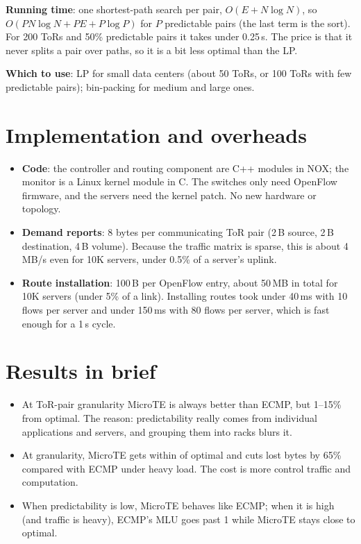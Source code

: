 \textbf{Running time}: one shortest-path search per pair, $O(E + N\log N)$, so $O(PN\log N + PE + P\log P)$ for $P$ predictable pairs
(the last term is the sort). For 200 ToRs and 50\% predictable pairs it takes under 0.25\,s. The price is that it never splits a pair over
paths, so it is a bit less optimal than the LP.

\textbf{Which to use}: LP for small data centers (about 50 ToRs, or 100 ToRs with few predictable pairs); bin-packing for medium and large ones.

\section{Implementation and overheads}
\begin{itemize}
  \item \textbf{Code}: the controller and routing component are C++ modules in NOX; the monitor is a Linux kernel module in C. The switches only need
        OpenFlow firmware, and the servers need the kernel patch. No new hardware or topology.
  \item \textbf{Demand reports}: 8 bytes per communicating ToR pair (2\,B source, 2\,B destination, 4\,B volume). Because the traffic matrix is sparse,
        this is about 4\,MB/s even for 10K servers, under 0.5\% of a server's uplink.
  \item \textbf{Route installation}: 100\,B per OpenFlow entry, about 50\,MB in total for 10K servers (under 5\% of a link). Installing routes took
        under 40\,ms with 10 flows per server and under 150\,ms with 80 flows per server, which is fast enough for a 1\,s cycle.
\end{itemize}

\section{Results in brief}
\begin{itemize}
  \item At ToR-pair granularity MicroTE is always better than ECMP, but 1--15\% from optimal. The reason: predictability really comes from
        individual applications and servers, and grouping them into racks blurs it.
  \item At  granularity, MicroTE gets within  of optimal and cuts lost bytes by 65\% compared with ECMP
        under heavy load. The cost is more control traffic and computation.
  \item When predictability is low, MicroTE behaves like ECMP; when it is high (and traffic is heavy), ECMP's MLU goes past 1 while MicroTE stays
        close to optimal.
\end{itemize}

